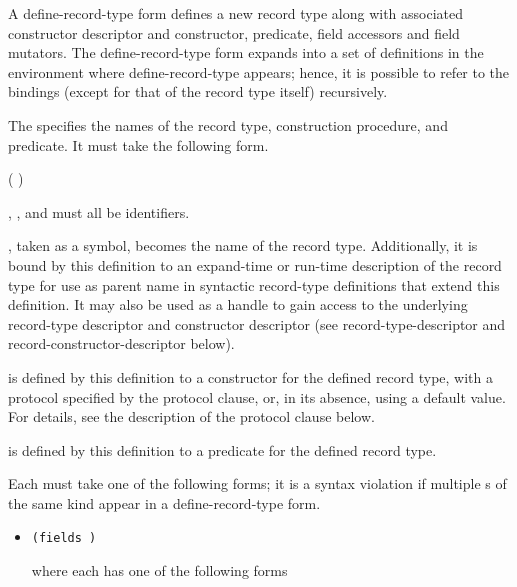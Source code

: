 \begin{entry}{%
}

A {\cf define-record-type} form defines a new record type along with
associated constructor descriptor and constructor, predicate, field
accessors and field mutators. The {\cf define-record-type} form expands into
a set of definitions in the environment where {\cf define-record-type}
appears; hence, it is possible to refer to the bindings (except for
that of the record type itself) recursively.

The  specifies the names of the record type,
construction procedure, and predicate. It must take the following
form.

\begin{scheme}
(  )
\end{scheme}

, , and  must all be identifiers.

, taken as a symbol, becomes the name of the record
type.  Additionally, it is bound by this definition to an expand-time
or run-time description of the record type for use as parent name in
syntactic record-type definitions that extend this definition. It may
also be used as a handle to gain access to the underlying record-type
descriptor and constructor descriptor (see {\cf
  record-type-descriptor} and {\cf record-constructor-descriptor}
below).

 is defined by this definition to a
constructor for the defined record type, with a protocol specified by
the protocol clause, or, in its absence, using a default value. For
details, see the description of the protocol clause below.

 is defined by this definition to a predicate
for the defined record type.

Each  must take one of the following forms; it is
a syntax violation if multiple s of the same kind appear in a
{\cf define-record-type} form.

\begin{itemize}
\item {\tt (fields )}
   
  where each  has one of the following forms
  

\end{itemize}
\end{entry}
